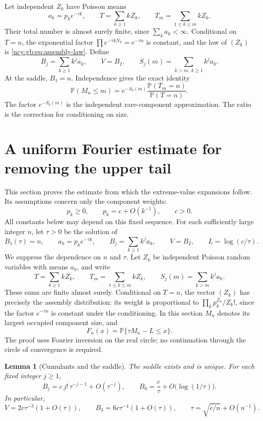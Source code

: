 \documentclass[11pt,letterpaper]{article}
\numberwithin{equation}{section}
\newtheorem{lemma}[theorem]{Lemma}
\theoremstyle{remark}\newtheorem{remark}[theorem]{Remark}
\theoremstyle{definition}\newtheorem{definition}[theorem]{Definition}\theoremstyle{plain}
\newcommand{\Pbb}{\mathbb P}
\begin{document}
Let independent \(Z_k\) have Poisson means
\[
 a_k=p_ke^{-\tau k},\qquad
 T=\sum_{k\ge1}kZ_k,\qquad T_m=\sum_{1\le k\le m}kZ_k.
\]
Their total number is almost surely finite, since
\(\sum_k a_k<\infty\). Conditional on \(T=n\), the exponential factor
\(\prod e^{-\tau kN_k}=e^{-\tau n}\) is constant, and the law of
\((Z_k)\) is \eqref{ncy:gb:eq:assembly-law}. Define
\begin{equation}\label{ncy:gb:eq:moments}
 B_j=\sum_{k\ge1}k^ja_k,\qquad V=B_2,\qquad
 S_j(m)=\sum_{k>m,\ k\ge1}k^ja_k.
\end{equation}
At the saddle, \(B_1=n\). Independence gives the exact identity
\begin{equation}\label{ncy:gb:eq:conditioning}
 \Pbb(M_n\le m)
 =e^{-S_0(m)}\frac{\Pbb(T_m=n)}{\Pbb(T=n)}.
\end{equation}
The factor \(e^{-S_0(m)}\) is the independent rare-component
approximation. The ratio is the correction for conditioning on size.

\section{A uniform Fourier estimate for removing the upper tail}
\label{ncy:gb:sec:fourier}

This section proves the estimate from which the extreme-value expansions
follow.  Its assumptions concern only the component weights:
\[
 p_k\geq0,\qquad p_k=c+O(k^{-1}),\qquad c>0.
\]
All constants below may depend on this fixed sequence.  For each sufficiently
large integer $n$, let $\tau>0$ be the solution of
\[
 B_1(\tau)=n,\qquad
 a_k=p_ke^{-\tau k},\qquad
 B_j=\sum_{k\geq1}k^j a_k,\qquad V=B_2,
 \qquad L=\log(c/\tau).
\]
We suppress the dependence on $n$ and $\tau$.  Let $Z_k$ be independent
Poisson random variables with means $a_k$, and write
\[
 T=\sum_{k\geq1}kZ_k,\qquad
 T_m=\sum_{1\leq k\leq m}kZ_k,
 \qquad S_j(m)=\sum_{k>m}k^j a_k.
\]
These sums are finite almost surely.  Conditional on $T=n$, the vector
$(Z_k)$ has precisely the assembly distribution: its weight is proportional
to $\prod_k p_k^{Z_k}/Z_k!$, since the factor $e^{-\tau n}$ is constant
under the conditioning.  In this section $M_n$ denotes its largest occupied
component size, and
\[
 F_n(x)=\Pbb\{\tau M_n-L\leq x\}.
\]
The proof uses Fourier inversion on the real circle; no continuation
through the circle of convergence is required.

\begin{lemma}[Cumulants and the saddle]
\label{ncy:gb:lem:cumulants}
The saddle exists and is unique.  For each fixed integer $j\geq1$,
\[
 B_j=c\,j!\,\tau^{-j-1}+O(\tau^{-j}),
 \qquad
 B_0=\frac c\tau+O\bigl(\log(1/\tau)\bigr).
\]
In particular,
\[
 V=2c\tau^{-3}(1+O(\tau)),\qquad
 B_3=6c\tau^{-4}(1+O(\tau)),\qquad
 \tau=\sqrt{c/n}+O(n^{-1}).
\]
\end{lemma}
\end{document}
